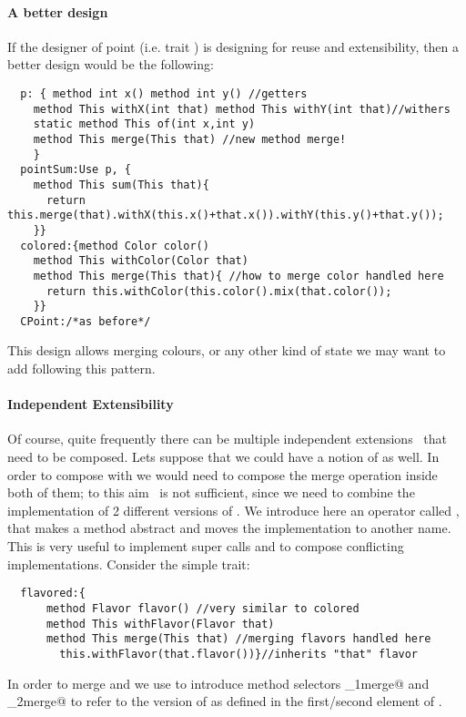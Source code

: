 \paragraph{A better design}
If the designer of point (i.e. trait \Q@p@) is designing for reuse and extensibility, then 
a better design would be the following:  
\saveSpace\begin{lstlisting}
  p: { method int x() method int y() //getters
    method This withX(int that) method This withY(int that)//withers
    static method This of(int x,int y)
    method This merge(This that) //new method merge!
    }
  pointSum:Use p, { 
    method This sum(This that){
      return this.merge(that).withX(this.x()+that.x()).withY(this.y()+that.y());
    }}
  colored:{method Color color()
    method This withColor(Color that)
    method This merge(This that){ //how to merge color handled here
      return this.withColor(this.color().mix(that.color());
    }}
  CPoint:/*as before*/
\end{lstlisting}  \saveSpace
  \noindent This design allows merging colours, or any other kind of state we may want to add
  following this pattern.%

\paragraph{Independent Extensibility}
  Of course, quite frequently there can be multiple independent
  extensions~\cite{Zenger-Odersky2005} that need to be composed. Lets suppose that 
  we could have a notion of \Q@flavoured@ as well.   
  In order to compose \Q@colored@ with \Q@flavored@ we would
  need to compose the merge operation inside both of them; to this aim \use\ is not sufficient, since we need to combine the implementation of 2 different versions of \Q@merge@.
We introduce here an operator called \Q@super@, that
 makes a method abstract and
moves the implementation to another name. This is very useful to implement super calls
 and to compose conflicting implementations.
\noindent Consider the simple \Q@flavored@ trait:
\saveSpace\begin{lstlisting}
  flavored:{
      method Flavor flavor() //very similar to colored
      method This withFlavor(Flavor that)
      method This merge(This that) //merging flavors handled here
        this.withFlavor(that.flavor())}//inherits "that" flavor
\end{lstlisting}  \saveSpace\saveSpace

\noindent In order to merge \Q@colored@ and \Q@flavored@ we use  \Q@super@ to introduce method selectors \Q@_1merge@ and \Q@_2merge@
to refer to the version of \Q@merge@ as defined in the first/second element of \use.

